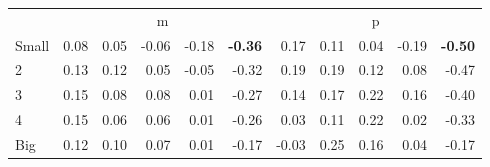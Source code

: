 \begin{tabular}{lrrrrrrrrrr}
  
    
  
     & \multicolumn{5}{c}{m} & \multicolumn{5}{c}{p}   \\
     \cmidrule(r){2-6} \cmidrule(r){7-11} 
    Small  & 0.08  & 0.05  & -0.06  & -0.18  & \textbf{-0.36}  & 0.17  & 0.11  & 0.04  & -0.19  & \textbf{-0.50}   \\
    2  & 0.13  & 0.12  & 0.05  & -0.05  & -0.32  & 0.19  & 0.19  & 0.12  & 0.08  & -0.47   \\
    3  & 0.15  & 0.08  & 0.08  & 0.01  & -0.27  & 0.14  & 0.17  & 0.22  & 0.16  & -0.40   \\
    4  & 0.15  & 0.06  & 0.06  & 0.01  & -0.26  & 0.03  & 0.11  & 0.22  & 0.02  & -0.33   \\
    Big  & 0.12  & 0.10  & 0.07  & 0.01  & -0.17  & -0.03  & 0.25  & 0.16  & 0.04  & -0.17   \\
    
  


\end{tabular}
